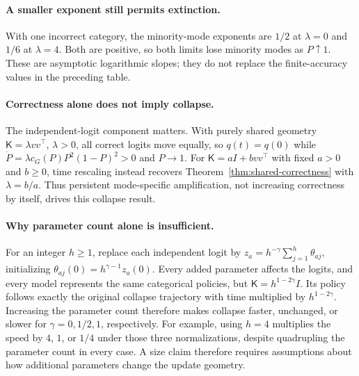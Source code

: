 \paragraph{A smaller exponent still permits extinction.}
With one incorrect category, the minority-mode exponents are $1/2$ at
$\lambda=0$ and $1/6$ at $\lambda=4$. Both are positive, so both limits
lose minority modes as $P\uparrow1$. These are asymptotic logarithmic slopes;
they do not replace the finite-accuracy values in the preceding table.

\paragraph{Correctness alone does not imply collapse.}
The independent-logit component matters. With purely shared geometry
$\mathsf K=\lambda vv^\top$, $\lambda>0$, all correct logits move equally,
so $q(t)=q(0)$ while
$\dot P=\lambda c_G(P)P^2(1-P)^2>0$ and $P\to1$.
For $\mathsf K=aI+bvv^\top$ with fixed $a>0$ and $b\ge0$, time rescaling
instead recovers Theorem~\ref{thm:shared-correctness} with $\lambda=b/a$.
Thus persistent mode-specific amplification, not increasing correctness by
itself, drives this collapse result.

\paragraph{Why parameter count alone is insufficient.}
For an integer $h\ge1$, replace each independent logit by
$z_a=h^{-\gamma}\sum_{j=1}^h\theta_{aj}$, initializing
$\theta_{aj}(0)=h^{\gamma-1}z_a(0)$. Every added parameter affects the logits,
and every model represents the same categorical policies, but
$\mathsf K=h^{1-2\gamma}I$. Its policy follows exactly the original collapse
trajectory with time multiplied by $h^{1-2\gamma}$. Increasing the parameter
count therefore makes collapse faster, unchanged, or slower for
$\gamma=0,1/2,1$, respectively. For example, using $h=4$ multiplies the speed by $4$, $1$, or $1/4$
under those three normalizations, despite quadrupling the parameter count
in every case. A size claim therefore requires assumptions about how
additional parameters change the update geometry.

